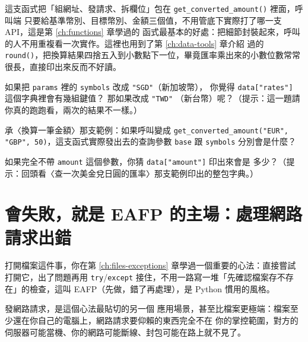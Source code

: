 
這支函式把「組網址、發請求、拆欄位」包在 \texttt{get\_converted\_amount()} 裡面，呼叫端
只要給基準幣別、目標幣別、金額三個值，不用管底下實際打了哪一支 API，這是第 \ref{ch:functions} 章學過的
函式最基本的好處：把細節封裝起來，呼叫的人不用重複看一次實作。這裡也用到了第 \ref{ch:data-tools} 章介紹
過的 \texttt{round()}，把換算結果四捨五入到小數點下一位，畢竟匯率乘出來的小數位數常常
很長，直接印出來反而不好讀。


\begin{drills}[label=drills:currency-api]
\item 如果把 \texttt{params} 裡的 \texttt{symbols} 改成 \texttt{"SGD"}（新加坡幣），
你覺得 \texttt{data["rates"]} 這個字典裡會有幾組鍵值？ 那如果改成 \texttt{"TWD"}
（新台幣）呢？（提示：這一題請你真的跑跑看，兩次的結果不一樣。）
\item 承〈換算一筆金額〉那支範例：如果呼叫變成
\texttt{get\_converted\_amount("EUR", "GBP", 50)}，這支函式實際發出去的查詢參數
\texttt{base} 跟 \texttt{symbols} 分別會是什麼？
\item 如果完全不帶 \texttt{amount} 這個參數，你猜 \texttt{data["amount"]} 印出來會是
多少？（提示：回頭看〈查一次美金兌日圓的匯率〉那支範例印出的整包字典。）
\end{drills}

\section{會失敗，就是 EAFP 的主場：處理網路請求出錯}
\label{sec:eafp-requests}

打開檔案這件事，你在第 \ref{ch:files-exceptions} 章學過一個重要的心法：直接嘗試打開它，出了問題再用
\texttt{try}/\texttt{except} 接住，不用一路寫一堆「先確認檔案存不存在」的檢查，這叫
EAFP（先做，錯了再處理），是 Python 慣用的風格。

發網路請求，是這個心法最貼切的另一個
應用場景，甚至比檔案更極端：檔案至少還在你自己的電腦上，網路請求要仰賴的東西完全不在
你的掌控範圍，對方的伺服器可能當機、你的網路可能斷線、封包可能在路上就不見了。

